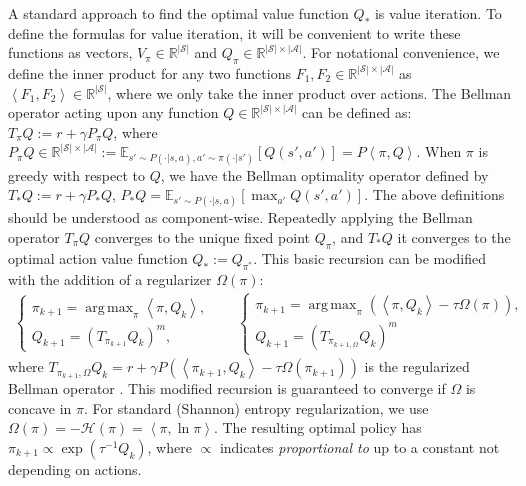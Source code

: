 \documentclass{article}
\DeclareMathOperator*{\argmax}{arg\,max}
\newcommand{\RSA}{\mathbb{R}^{|\mathcal{S}|\times|\mathcal{A}|}}
\newcommand{\RS}{\mathbb{R}^{|\mathcal{S}|}}
\newcommand{\AdaBracket}[1]{\left(#1\right)}
\newcommand{\AdaRectBracket}[1]{\left[#1\right]}
\newcommand{\AdaAngleProduct}[2]{\left\langle#1, #2\right\rangle}
\newcommand{\entropy}{\mathcal{H}\left( \pi \right)}
\newcommand{\transition}{\gamma P_{\pi}}
\newcommand{\greedy}[1]{\argmax_{\pi}\!\AdaAngleProduct{\pi}{#1}}
\newcommand{\greedyOmega}[1]{\argmax_{\pi}\!\AdaBracket{\AdaAngleProduct{\pi}{#1} - \tau\Omega(\pi)}}
\newcommand{\BellmanOmega}[2]{r + \gamma P\!\AdaBracket{ \AdaAngleProduct{\pi_{#1}}{Q_{#2}} - \tau\Omega(\pi_{#1})}}
\begin{document}
A standard approach to find the optimal value function $Q_*$ is value iteration. To define the formulas for value iteration, it will be convenient to write these functions as vectors, $V_{\pi} \in \RS$ and $Q_{\pi} \!\in\! \RSA$. 
For notational convenience, we define the inner product for any two functions $F_1,F_2\in\RSA$  as $\AdaAngleProduct{F_1}{F_2} \in \RS$, where we only take the inner product over actions. 
The Bellman operator acting upon any function $Q \!\in\! \RSA$ can be defined as: $T_{\pi}Q := r + \transition Q$, where $P_{\pi}Q \!\in\! \RSA \!:=\! \mathbb{E}_{s'\sim P(\cdot|s,a),a'\sim\pi(\cdot|s')}\!\AdaRectBracket{Q(s',a')} \!=\! P\!\AdaAngleProduct{\pi}{Q}$.
When $\pi$ is greedy with respect to $Q$, we have the Bellman optimality operator defined by $T_*Q := r + \gamma P_* Q$, $P_*Q \!=\! \mathbb{E}_{s'\sim P(\cdot|s,a)}\!\AdaRectBracket{\max_{a'}Q(s',a')}$. 
The above definitions should be understood as component-wise.
Repeatedly applying the Bellman operator $T_{\pi}Q$ converges to the unique fixed point $Q_{\pi}$, and $T_*Q$ it converges to the optimal action value function $Q_*:=Q_{\pi^*}$.
This basic recursion can be modified with the addition of a regularizer $\Omega(\pi)$:
\begin{align}
    \begin{cases}
        \pi_{k+1} = \greedy{Q_{k}}, & \\
        Q_{k+1} =  \AdaBracket{ T_{\pi_{k+1}} Q_k }^m , &
    \end{cases}
    \label{eq:PI}
\quad
    \begin{cases}
        \pi_{k+1} = \greedyOmega{Q_{k}}, & \\
        Q_{k+1} = \AdaBracket{T_{\pi_{k+1, \Omega}}Q_k}^m &
    \end{cases}
\end{align}
%
where $T_{\pi_{k+1}, \Omega}Q_k \!=\! \BellmanOmega{k+1}{k}$ is the regularized Bellman operator \citep{geist19-regularized}. This modified recursion is guaranteed to converge if $\Omega$ is concave in $\pi$. For standard (Shannon) entropy regularization, we use $\Omega(\pi) = -\entropy = \AdaAngleProduct{\pi}{\ln\pi}$. The resulting optimal policy has $\pi_{k+1} \propto \exp\AdaBracket{\tau^{-1}Q_k}$, where $\propto$ indicates \emph{proportional to} up to a constant not depending on actions.
\end{document}
